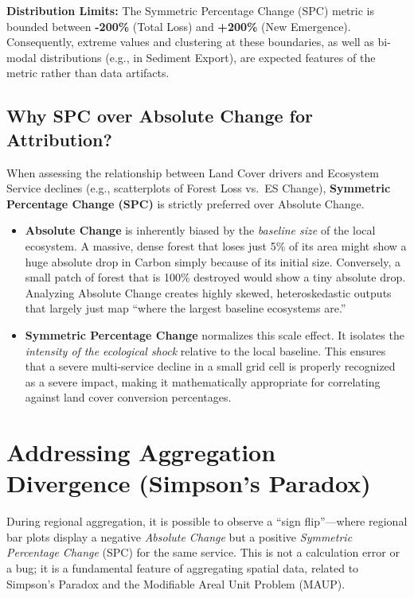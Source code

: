 \documentclass[
  letterpaper,
  DIV=11,
  numbers=noendperiod]{scrreprt}
\providecommand{\tightlist}{%
  \setlength{\itemsep}{0pt}\setlength{\parskip}{0pt}}
\begin{document}
\textbf{Distribution Limits:} The Symmetric Percentage Change (SPC)
metric is bounded between \textbf{-200\%} (Total Loss) and
\textbf{+200\%} (New Emergence). Consequently, extreme values and
clustering at these boundaries, as well as bi-modal distributions (e.g.,
in Sediment Export), are expected features of the metric rather than
data artifacts.

\subsection{Why SPC over Absolute Change for
Attribution?}\label{why-spc-over-absolute-change-for-attribution}

When assessing the relationship between Land Cover drivers and Ecosystem
Service declines (e.g., scatterplots of Forest Loss vs.~ES Change),
\textbf{Symmetric Percentage Change (SPC)} is strictly preferred over
Absolute Change.

\begin{itemize}
\tightlist
\item
  \textbf{Absolute Change} is inherently biased by the \emph{baseline
  size} of the local ecosystem. A massive, dense forest that loses just
  5\% of its area might show a huge absolute drop in Carbon simply
  because of its initial size. Conversely, a small patch of forest that
  is 100\% destroyed would show a tiny absolute drop. Analyzing Absolute
  Change creates highly skewed, heteroskedastic outputs that largely
  just map ``where the largest baseline ecosystems are.''
\item
  \textbf{Symmetric Percentage Change} normalizes this scale effect. It
  isolates the \emph{intensity of the ecological shock} relative to the
  local baseline. This ensures that a severe multi-service decline in a
  small grid cell is properly recognized as a severe impact, making it
  mathematically appropriate for correlating against land cover
  conversion percentages.
\end{itemize}

\section{Addressing Aggregation Divergence (Simpson's
Paradox)}\label{addressing-aggregation-divergence-simpsons-paradox}

During regional aggregation, it is possible to observe a ``sign
flip''---where regional bar plots display a negative \emph{Absolute
Change} but a positive \emph{Symmetric Percentage Change} (SPC) for the
same service. This is not a calculation error or a bug; it is a
fundamental feature of aggregating spatial data, related to Simpson's
Paradox and the Modifiable Areal Unit Problem (MAUP).
\end{document}
